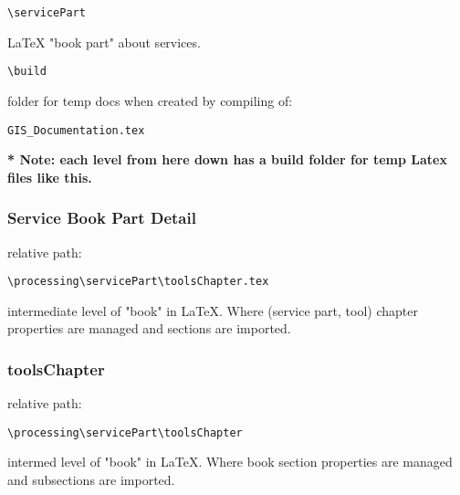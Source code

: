 \documentclass[class=book , crop=false]{standalone}
\begin{document}
\begin{verbatim}
\servicePart
\end{verbatim}
\begin{description}
\item \LaTeX{} "book part" about services.
\end{description}
\begin{verbatim}
\build
\end{verbatim}
\begin{description}
\item folder for temp docs when created by compiling of:
\begin{verbatim}
GIS_Documentation.tex
\end{verbatim}
\end{description}
\textbf{* Note: each level from here down has a build folder for temp Latex files like this.}
\newpage
\subsubsection{Service Book Part Detail}
relative path:
\begin{verbatim}
\processing\servicePart\toolsChapter.tex
\end{verbatim}
\begin{description}
\item  intermediate level of "book" in \LaTeX{}.  Where (service part, tool) chapter properties are managed and sections are imported.
\end{description}
\subsubsection{toolsChapter}
relative path:
\begin{verbatim}
\processing\servicePart\toolsChapter
\end{verbatim}
intermed level of "book" in \LaTeX{}.  Where book section properties are managed and subsections are imported.
\end{document}
